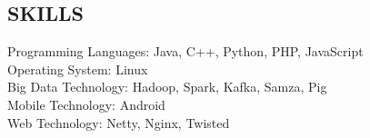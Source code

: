 \documentclass[mm, 7pt]{resume} %
\begin{document}
\begin{resume}
\section{SKILLS}

Programming Languages:             \hfill  Java, C++, Python, PHP, JavaScript  \\
Operating System:     \hfill  Linux \\
Big Data Technology:   \hfill Hadoop, Spark, Kafka, Samza, Pig \\
Mobile Technology:    \hfill  Android \\
Web Technology:       \hfill  Netty, Nginx, Twisted \\

\end{resume}
\end{document}
